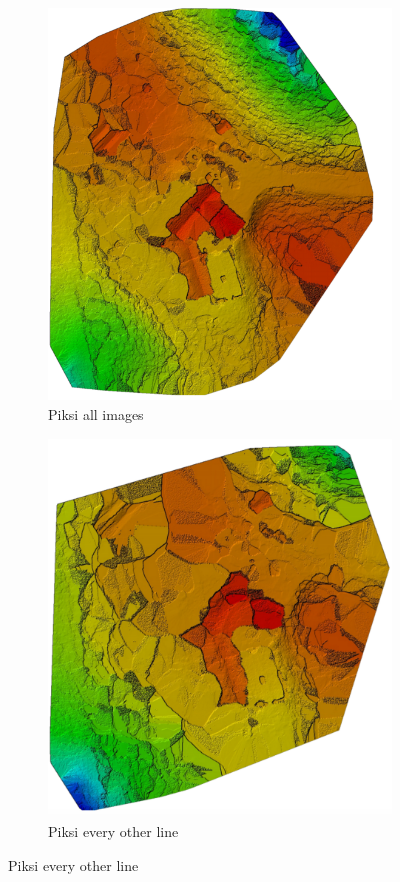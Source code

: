 \documentclass{article}
\begin{document}
\begin{figure}
\centering
\renewcommand*\thesubfigure{\arabic{subfigure}}
\begin{subfigure}{.33\textwidth}
  \centering
  \includegraphics[width=.72\linewidth]{images/DSM/p.png}
  \caption{Piksi all images}
  \label{fig:sub1}
\end{subfigure}%
\begin{subfigure}{.33\textwidth}
  \centering
  \includegraphics[width=.72\linewidth]{images/DSM/p_every_other_line.png}
  \caption{Piksi every other line}
  \label{fig:sub2}
\end{subfigure}

\end{figure}
\end{document}
